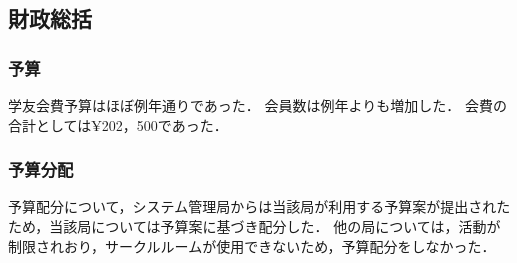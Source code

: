 \subsection*{財政総括}


\subsubsection*{予算}
学友会費予算はほぼ例年通りであった．
会員数は例年よりも増加した． 
会費の合計としては¥202，500であった．

\subsubsection*{予算分配}
予算配分について，システム管理局からは当該局が利用する予算案が提出されたため，当該局については予算案に基づき配分した．
他の局については，活動が制限されおり，サークルルームが使用できないため，予算配分をしなかった．
